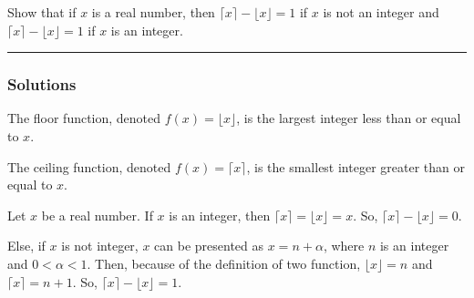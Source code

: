 \newpage
\begin{question}
Show that if $x$ is a real number, then $\lceil x \rceil - \lfloor x \rfloor = 1$ if $x$ is not an integer and $\lceil x \rceil - \lfloor x \rfloor = 1$ if $x$ is an integer. 
\end{question}

\par\noindent\rule{\textwidth}{0.5pt}

\subsubsection*{Solutions}
The floor function, denoted $f(x) = \lfloor x \rfloor$, is the largest integer less than or equal to $x$.

\noindent
The ceiling function, denoted $f(x) = \lceil x \rceil$, is the smallest integer greater than or equal to $x$.

\bigskip
\noindent
Let $x$ be a real number. If $x$ is an integer, then $\lceil x \rceil = \lfloor x \rfloor = x$. So, $\lceil x \rceil - \lfloor x \rfloor = 0$.

\bigskip
\noindent
Else, if $x$ is not integer, $x$ can be presented as $x = n + \alpha$, where $n$ is an integer and $0 < \alpha < 1$. Then, because of the definition of two function, $\lfloor x \rfloor = n$ and $\lceil x \rceil = n + 1$. So, $\lceil x \rceil - \lfloor x \rfloor = 1$.